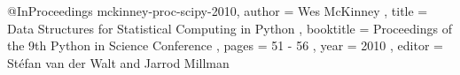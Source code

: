 @InProceedings{ mckinney-proc-scipy-2010, 
 author    = { Wes McKinney }, 
 title     = { Data Structures for Statistical Computing in Python }, 
 booktitle = { Proceedings of the 9th Python in Science Conference }, 
 pages     = { 51 - 56 }, 
 year      = { 2010 }, 
 editor    = { St\'efan van der Walt and Jarrod Millman }}
